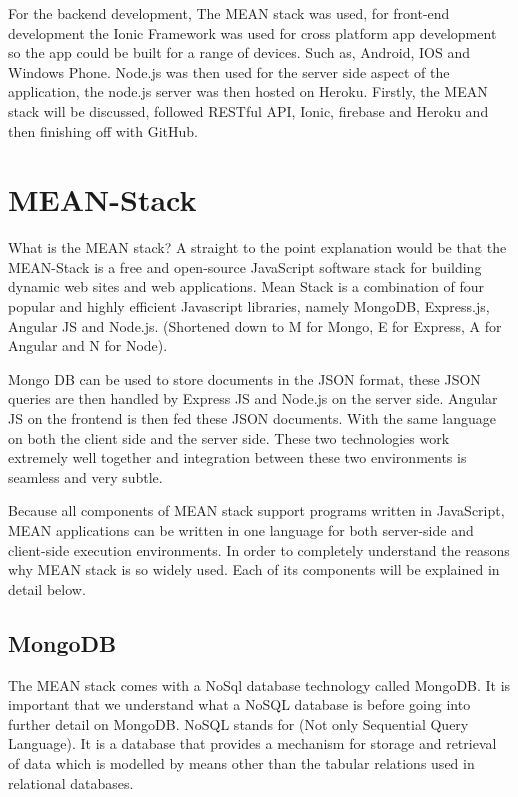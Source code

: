 For the backend development, The MEAN stack was used, for front-end development the Ionic Framework was used for cross platform app development so the app could be built for a range of devices. Such as, Android, IOS and Windows Phone. Node.js was then used for the server side aspect of the application, the node.js server was then hosted on Heroku. Firstly, the MEAN stack will be discussed, followed RESTful API, Ionic, firebase and Heroku and then finishing off with GitHub. 

\section{MEAN-Stack}
What is the MEAN stack? A straight to the point explanation would be that the MEAN-Stack is a free and open-source JavaScript software stack for building dynamic web sites and web applications. Mean Stack is a combination of four popular and highly efficient Javascript libraries, namely MongoDB, Express.js, Angular JS and Node.js. (Shortened down to M for Mongo, E for Express, A for Angular and N for Node). 

Mongo DB can be used to store documents in the JSON format, these JSON queries are then handled by Express JS and Node.js on the server side. Angular JS on the frontend is then fed these JSON documents. With the same language on both the client side and the server side. These two technologies work extremely well together and integration between these two environments is seamless and very subtle.\cite{Mean-Stack}

Because all components of MEAN stack support programs written in JavaScript, MEAN applications can be written in one language for both server-side and client-side execution environments. In order to completely understand the reasons why MEAN stack is so widely used. Each of its components will be explained in detail below. 



\subsection{MongoDB}
The MEAN stack comes with a NoSql database technology called MongoDB.
It is important that we understand what a NoSQL database is before going into further detail on MongoDB. NoSQL stands for (Not only Sequential Query Language). It is a database that provides a mechanism for storage and retrieval of data which is modelled by means other than the tabular relations used in relational databases. 

